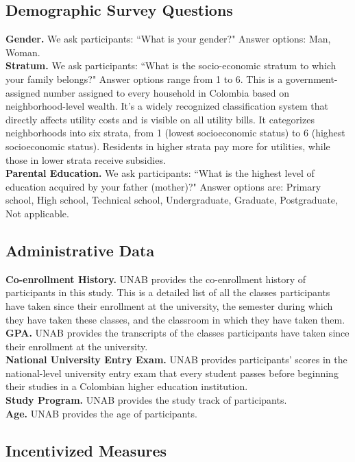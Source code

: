 \documentclass[11pt,a4paper,oneside]{article}
\begin{document}
\subsection{Demographic Survey Questions}
\textbf{Gender.} We ask participants: ``What is your gender?" Answer options: Man, Woman.\medskip \\
\textbf{Stratum.} We ask participants: ``What is the socio-economic stratum to which your family belongs?" Answer options range from 1 to 6. This is a government-assigned number assigned to every household in Colombia based on neighborhood-level wealth. It's a widely recognized classification system that directly affects utility costs and is visible on all utility bills. It categorizes neighborhoods into six strata, from 1 (lowest socioeconomic status) to 6 (highest socioeconomic status). Residents in higher strata pay more for utilities, while those in lower strata receive subsidies.\medskip \\
\textbf{Parental Education.} We ask participants: ``What is the highest level of education acquired by your father (mother)?" Answer options are: Primary school, High school, Technical school, Undergraduate, Graduate, Postgraduate, Not applicable.

\subsection{Administrative Data}
\textbf{Co-enrollment History.} UNAB provides the co-enrollment history of participants in this study. This is a detailed list of all the classes participants have taken since their enrollment at the university, the semester during which they have taken these classes, and the classroom in which they have taken them.  \medskip \\
\textbf{GPA.} UNAB provides the transcripts of the classes participants have taken since their enrollment at the university. \medskip\\
\textbf{National University Entry Exam.} UNAB provides participants' scores in the national-level university entry exam that every student passes before beginning their studies in a Colombian higher education institution. \medskip\\
\textbf{Study Program.} UNAB provides the study track of participants. \medskip\\
\textbf{Age.} UNAB provides the age of participants.

\subsection{Incentivized Measures}
\end{document}
